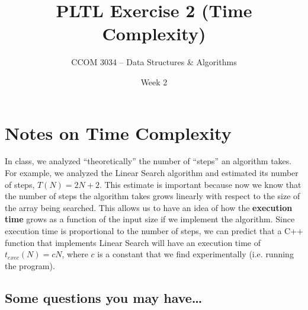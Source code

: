 \documentclass[11 pt]{article}
\title{PLTL Exercise 2 (Time Complexity)}
\author{CCOM 3034 – Data Structures \& Algorithms}
\date{Week 2}
\begin{document}
\maketitle




\section{Notes on Time Complexity}

In class, we analyzed ``theoretically'' the number of ``steps'' an algorithm takes. For example, we analyzed the Linear Search algorithm and estimated its number of steps, $T(N) = 2N + 2$. This estimate is important because now we know that the number of steps the algorithm takes grows linearly with respect to the size of the array being searched. This allows us to have an idea of how the \textbf{execution time} grows as a function of the input size if we implement the algorithm. Since execution time is proportional to the number of steps, we can predict that a C++ function that implements Linear Search will have an execution time of $t_{exec}(N) = c N$, where $c$ is a constant that we find experimentally (i.e. running the program).

\subsection{Some questions you may have\dots}
\end{document}
